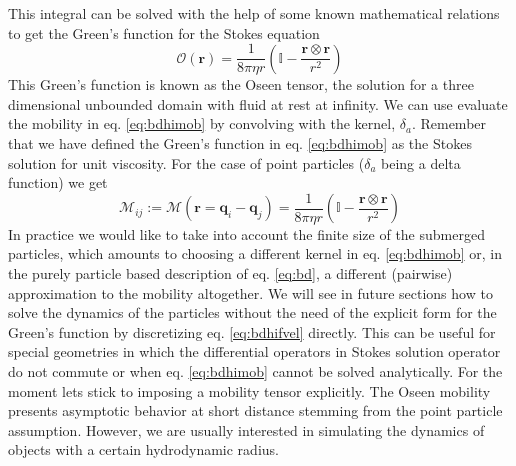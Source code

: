 \documentclass[ twoside,openright,titlepage,numbers=noenddot,%
headinclude,footinclude,cleardoublepage=empty,abstract=on,
BCOR=5mm,paper=a4,fontsize=11pt, dvipsnames
]{scrreprt}
\renewcommand{\vec}[1]{\bm{#1}}
\newcommand{\tens}[1]{\bm{\mathcal{#1}}}
\begin{document}
This integral can be solved with the help of some known mathematical relations\cite{Lisicki2013} to get the Green's function for the Stokes equation
\begin{equation}
  \label{eq:bdhioseen}
\tens{O}(\vec{r}) = \frac{1}{8\pi\eta r}\left(\mathbb{I} - \frac{\vec{r}\otimes\vec{r}}{r^2}\right)
\end{equation}
This Green's function is known as the Oseen tensor\cite{Oseen}, the solution for a three dimensional unbounded domain with fluid at rest at infinity. We can use evaluate the mobility in eq. \eqref{eq:bdhimob} by convolving with the kernel, $\delta_a$. Remember that we have defined the Green's function in eq. \eqref{eq:bdhimob} as the Stokes solution for unit viscosity. For the case of point particles ($\delta_a$ being a delta function) we get
\begin{equation}
  \label{eq:oseenmob}
  \tens{M}_{ij} := \tens{M}(\vec{r} = \vec{q}_i - \vec{q}_j) = \frac{1}{8\pi\eta r}\left(\mathbb{I} - \frac{\vec{r}\otimes\vec{r}}{r^2}\right)
\end{equation}
In practice we would like to take into account the finite size of the submerged particles, which amounts to choosing a different kernel in eq. \eqref{eq:bdhimob} or, in the purely particle based description of eq. \eqref{eq:bd}, a different (pairwise) approximation to the mobility altogether.
We will see in future sections how to solve the dynamics of the particles without the need of the explicit form for the Green's function by discretizing eq. \eqref{eq:bdhifvel} directly. This can be useful for special geometries in which the differential operators in Stokes solution operator do not commute or when eq. \eqref{eq:bdhimob} cannot be solved analytically. For the moment lets stick to imposing a mobility tensor explicitly.
The Oseen mobility presents asymptotic behavior at short distance stemming from the point particle assumption. However, we are usually interested in simulating the dynamics of objects with a certain hydrodynamic radius.
\end{document}
